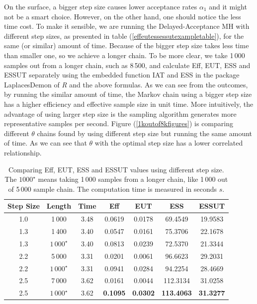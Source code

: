 On the surface, a bigger step size causes lower acceptance rates $\alpha_1$ and it might not be a smart choice. However, on the other hand, one should notice the less time cost. To make it sensible, we are running the Delayed-Acceptance MH with different step sizes, as presented in table (\ref{effeutessessutexampletable}),  for the same (or similar) amount of time. Because of the bigger step size takes less time than smaller one, so we achieve a longer chain. To be more clear, we take 1\,000 samples out from a longer chain, such as 8\,500, and calculate Eff, EUT, ESS and ESSUT separately using the embedded function \textsf{IAT} and \textsf{ESS} in the package \textsf{LaplacesDemon} of \textit{R} and the above formulas. As we can see from the outcomes, by running the similar amount of time, the Markov chain using a bigger step size has a higher efficiency and effective sample size in unit time. More intuitively, the advantage of using larger step size is the sampling algorithm generates more representative samples per second. Figure (\ref{1koutof8kfigures}) is comparing different $\theta$ chains found by using different step size but running the same amount of time. As we can see that $\theta$ with the optimal step size has a lower correlated relationship. 
\begin{table}[h]
\centering
\begin{tabular}{|c|c|c|c|c|c|c|}
\hline
Step Size& Length & Time & Eff   & EUT & ESS & ESSUT \\ \hline
1.0    &   1\,000        & 3.48   & 0.0619 & 0.0178   &  69.4549     & 19.9583   \\ \hline
1.3    &   1\,400        & 3.40   & 0.0547 & 0.0161   &  75.3706   & 22.1678 \\ \hline
1.3    &   $1\,000^\star$ & 3.40 & 0.0813 & 0.0239  & 72.5370  & 21.3344   \\ \hline
2.2    &   5\,000          &  3.31 & 0.0201 &  0.0061  &  96.6623    & 29.2031   \\ \hline
2.2    &   $1\,000^\star$ & 3.31  &  0.0941 & 0.0284 & 94.2254 &  28.4669 \\ \hline
2.5    &   7\,000          &  3.62  & 0.0161 &0.0044  & 112.3134   &  31.0258    \\ \hline
2.5    &   $1\,000^\star$ &  3.62 & \textbf{0.1095} &  \textbf{0.0302}  &  \textbf{113.4063} & \textbf{31.3277} \\ \hline
\end{tabular}
\caption{Comparing Eff, EUT, ESS and ESSUT values using different step size. The $1000^\star$ means taking 1\,000 samples from a longer chain, like 1\,000 out of 5\,000 sample chain. The computation time is measured in seconds $s$.}
\label{stepsizecompare}
\end{table}


